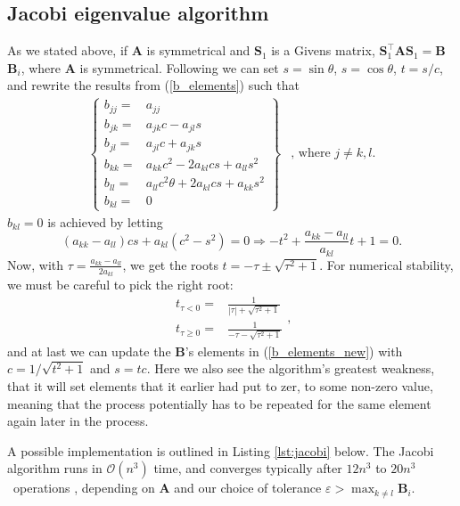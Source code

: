 \documentclass[]{article}
\begin{document}
\subsection{Jacobi eigenvalue algorithm}
As we stated above, if $\mathbf{A}$ is symmetrical and $\mathbf{S}_1$ is a Givens matrix, $\mathbf{S}_1^\intercal \mathbf{A} \mathbf{S}_1 = \mathbf{B}$  $\mathbf{B}_i$, where $\mathbf{A}$ is symmetrical. Following \cite{fys4150-p2} we can set $s = \sin \theta$, $s = \cos \theta$, $t = s/c$, and rewrite the results from (\ref{b_elements}) such that
\begin{equation}
\label{b_elements_new}
\begin{array}{cc}
\left\{
\begin{aligned}
b_{jj} =& a_{jj} \\
b_{jk} =& a_{jk}c - a_{jl}s \\
b_{jl} =& a_{jl}c + a_{jk}s \\
b_{kk} =& a_{kk}c^2 - 2a_{kl}cs +a_{ll}s^2 \\
b_{ll} =& a_{ll}c^2\theta +2a_{kl}cs +a_{kk}s^2 \\
b_{kl} =& 0 
\end{aligned}
\right\} &
\text{, where } j \ne k,l.
\end{array}
\end{equation}
$b_{kl} = 0$ is achieved by letting
\[
	(a_{kk}-a_{ll})cs +a_{kl}(c^2-s^2) = 0 \Rightarrow -t^2 + \frac{a_{kk}-a_{ll}}{a_{kl}}t + 1 = 0.
\]
Now, with $\tau = \frac{a_{kk}-a_{ll}}{2a_{kl}}$, we get the roots $t = -\tau \pm \sqrt{\tau^2 + 1}$. For numerical stability, we must be careful to pick the right root:
\begin{equation*}
\begin{aligned}
	t_{\tau<0} =& \frac{1}{|\tau| + \sqrt{\tau^2 + 1}} \\
	t_{\tau \ge 0} =& \frac{1}{-\tau - \sqrt{\tau^2 + 1}}
\end{aligned},
\end{equation*}
and at last we can update the $\mathbf{B}$'s elements in (\ref{b_elements_new}) with $c = 1/\sqrt{t^2 + 1}$ and $s = tc$. Here we also see the algorithm's greatest weakness, that it will set elements that it earlier had put to zer, to some non-zero value, meaning that the process potentially has to be repeated for the same element again later in the process.

A possible implementation is outlined in Listing \ref{lst:jacobi} below. The Jacobi algorithm runs in $\mathcal{O}(n^3)$ time, and converges typically after $12n^3$ to $20n^3$ operations \cite{fys4150-notes}, depending on $\mathbf{A}$ and our choice of tolerance $\varepsilon > \max_{k \neq l} \mathbf{B}_i$.
\end{document}
